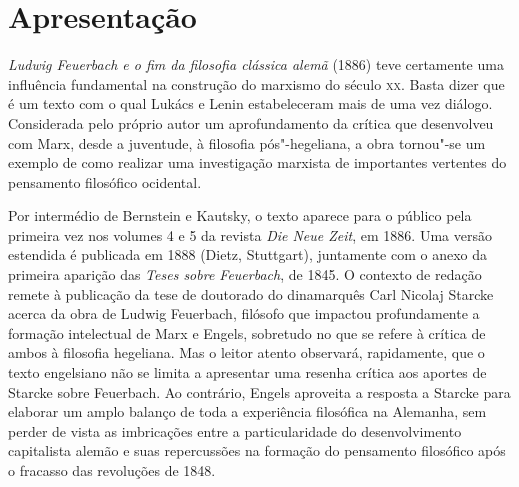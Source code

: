 \pagebreak
\thispagestyle{empty}
\movetooddpage
\chapter{Apresentação}


\noindent{}\emph{Ludwig Feuerbach e o fim da filosofia clássica alemã} (1886) teve
certamente uma influência fundamental na construção do marxismo do
século \textsc{xx}. Basta dizer que é um texto com o qual Lukács e Lenin
estabeleceram mais de uma vez diálogo. Considerada pelo próprio autor um
aprofundamento da crítica que desenvolveu com Marx, desde a juventude, à
filosofia pós"-hegeliana, a obra tornou"-se um exemplo de como realizar
uma investigação marxista de importantes vertentes do pensamento
filosófico ocidental. %

Por intermédio de Bernstein e Kautsky, o texto aparece para o público
pela primeira vez nos volumes 4 e 5 da revista \emph{Die Neue Zeit}, em
1886. Uma versão estendida é publicada em 1888 (Dietz, Stuttgart),
juntamente com o anexo da primeira aparição das \emph{Teses sobre %
Feuerbach}, de 1845. O contexto de redação remete à publicação da tese de doutorado do
dinamarquês Carl Nicolaj Starcke acerca da obra de Ludwig Feuerbach,
filósofo que impactou profundamente a formação intelectual de Marx e
Engels, sobretudo no que se refere à crítica de ambos à filosofia
hegeliana. Mas o leitor atento observará, rapidamente, que o texto
engelsiano não se limita a apresentar uma resenha crítica aos aportes de
Starcke sobre Feuerbach. Ao contrário, Engels aproveita a resposta a
Starcke para elaborar um amplo balanço de toda a experiência filosófica na
Alemanha, sem perder de vista as imbricações entre a particularidade do
desenvolvimento capitalista alemão e suas repercussões na formação do
pensamento filosófico após o fracasso das revoluções de 1848.

